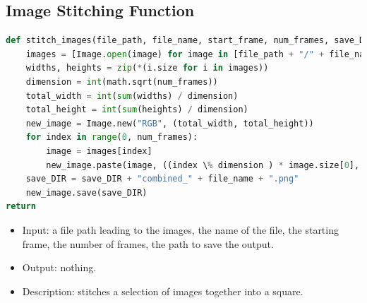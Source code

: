 \documentclass[12pt]{article}
\numberwithin{figure}{section} %
\begin{document}
\subsection{Image Stitching Function}
\label{subsection:Image Stitching Function}
\begin{lstlisting}[language = Python]
def stitch_images(file_path, file_name, start_frame, num_frames, save_DIR):
    images = [Image.open(image) for image in [file_path + "/" + file_name + str(x) + ".png" for x in range(start_frame, start_frame + num_frames)]]
    widths, heights = zip(*(i.size for i in images))
    dimension = int(math.sqrt(num_frames))
    total_width = int(sum(widths) / dimension)
    total_height = int(sum(heights) / dimension)
    new_image = Image.new("RGB", (total_width, total_height))
    for index in range(0, num_frames):
        image = images[index]
        new_image.paste(image, ((index \% dimension ) * image.size[0], math.floor(index / dimension) * image.size[1]))
    save_DIR = save_DIR + "combined_" + file_name + ".png"
    new_image.save(save_DIR)
return
\end{lstlisting}
\vspace{-1.5em}
\begin{itemize}[leftmargin = 0.5cm, topsep=0pt,itemsep=-1ex,partopsep=1ex,parsep=1ex]
\item Input: a file path leading to the images, the name of the file, the starting frame, the number of frames, the path to save the output.  
\item Output: nothing. 
\item Description: stitches a selection of images together into a square.  
\end{itemize}
\end{document}
